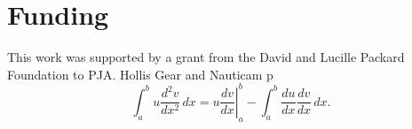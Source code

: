 \section{Funding}
\label{funding} 
This work was supported by a grant from the David and Lucille Packard Foundation to PJA. Hollis Gear and Nauticam p
\begin{equation}
\label{eqn:drag}
	\int_a^bu\frac{d^2v}{dx^2}\,dx
	=\left.u\frac{dv}{dx}\right|_a^b
	-\int_a^b\frac{du}{dx}\frac{dv}{dx}\,dx.
\end{equation}

